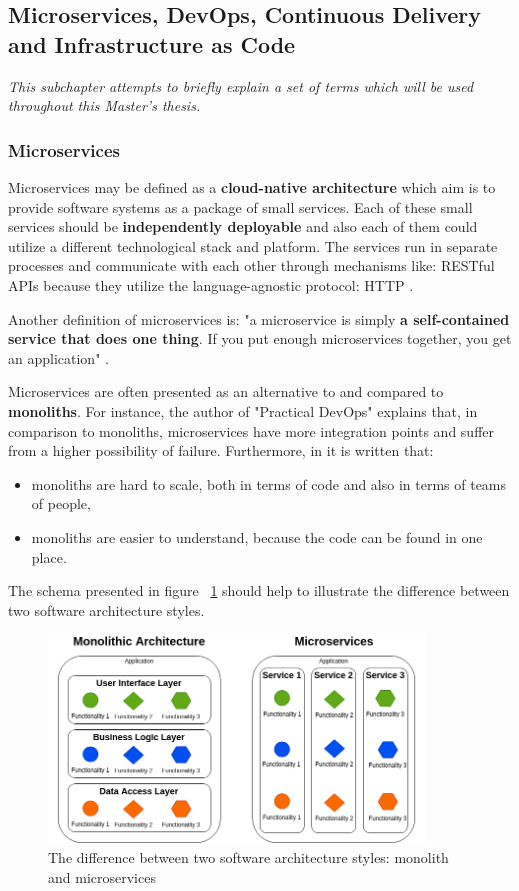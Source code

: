 \subsection{Microservices, DevOps, Continuous Delivery and Infrastructure as Code}
\textit{This subchapter attempts to briefly explain a set of terms which will be used throughout this Master's thesis.}


\subsubsection{Microservices}
Microservices may be defined as a \textbf{cloud-native architecture} which aim is to provide software systems as a package of small services. Each of these small services should be \textbf{independently deployable} and also each of them could utilize a different technological stack and platform. The services run in separate processes and communicate with each other through mechanisms like: RESTful APIs \cite{article-micro-devops} because they utilize the language-agnostic protocol: HTTP \cite{book-pr-devops}.

Another definition of microservices is: "a microservice is simply \textbf{a self-contained service that does one thing}. If you put enough microservices together, you get an application" \cite{book-cndwk}.

Microservices are often presented as an alternative to and compared to \textbf{monoliths}. For instance, the author of "Practical DevOps" \cite{book-pr-devops} explains that, in comparison to monoliths, microservices have more integration points and suffer from a
higher possibility of failure. Furthermore, in \cite{book-cndwk} it is written that:
\begin{itemize}
\item monoliths are hard to scale, both in terms of code and also in terms of teams of people,
\item monoliths are easier to understand, because the code can be found in one place.
\end{itemize}

The schema presented in figure ~\ref{fig:microservices-vs-mono} should help to illustrate the difference between two software architecture styles.
\begin{figure}[H]
    \centering
    \includegraphics[width=10cm]{figures/microservices-vs-mono.png}
    \captionsetup{justification=centering,margin=2cm}
    \caption{The difference between two software architecture styles: monolith and microservices \cite{online-trans-mono-micro}}
    \label{fig:microservices-vs-mono}
\end{figure}

